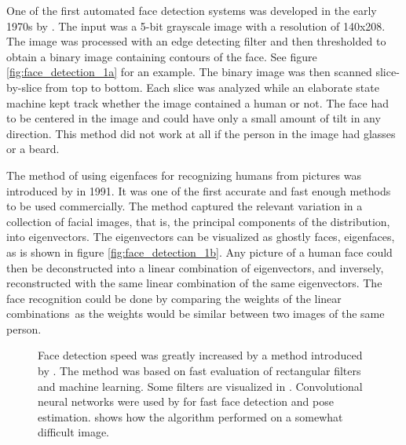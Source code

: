 One of the first automated face detection systems was developed in the early 1970s by \textcite{Sakai1972}. The input was a 5-bit grayscale image with a resolution of 140x208. The image was processed with an edge detecting filter and then thresholded to obtain a binary image containing contours of the face. See figure \ref{fig:face_detection_1a} for an example. The binary image was then scanned slice-by-slice from top to bottom. Each slice was analyzed while an elaborate state machine kept track whether the image contained a human or not. The face had to be centered in the image and could have only a small amount of tilt in any direction. This method did not work at all if the person in the image had glasses or a beard.

The method of using eigenfaces for recognizing humans from pictures was introduced by \textcite{Turk1991} in 1991. It was one of the first accurate and fast enough methods to be used commercially. The method captured the relevant variation in a collection of facial images, that is, the principal components of the distribution, into eigenvectors. The eigenvectors can be visualized as ghostly faces, eigenfaces, as is shown in figure \ref{fig:face_detection_1b}. Any picture of a human face could then be deconstructed into a linear combination of eigenvectors, and inversely, reconstructed with the same linear combination of the same eigenvectors. The face recognition could be done by comparing the weights of the linear combinations as the weights would be similar between two images of the same person.

\begin{figure}
    \centering
    \hfill
    \caption[Face detection 2]{Face detection speed was greatly increased by a method introduced by \textcite{Viola2001}. The method was based on fast evaluation of rectangular filters and machine learning. Some filters are visualized in \protect{}. Convolutional neural networks were used by \textcite{Osadchy2007} for fast face detection and pose estimation. \protect{} shows how the algorithm performed on a somewhat difficult image.}
    \label{fig:face_detection_2}
\end{figure}

